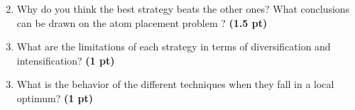 \documentclass[11pt,a4paper]{report}
\begin{document}
\begin{answers}[3.5cm]
\end{answers}


\newpage
\begin{enumerate}
\setcounter{enumi}{3}
\begin{enumerate}
\setcounter{enumii}{1}
    \item Why do you think the best strategy beats the other ones? What conclusions can be drawn on the atom placement problem ? \textbf{(1.5 pt)}
\end{enumerate}
\end{enumerate}

\begin{answers}[7.5cm]
\end{answers}



\begin{enumerate}
\setcounter{enumi}{3}
\begin{enumerate}
\setcounter{enumii}{2}
    \item What are the limitations of each strategy in terms of diversification 
    and intensification? \textbf{(1 pt)}
\end{enumerate}
\end{enumerate}

\begin{answers}[5cm]
\end{answers}



\begin{enumerate}
\setcounter{enumi}{3}
\begin{enumerate}
\setcounter{enumii}{2}
    \item What is the behavior of the different techniques when they fall 
    in a local optimum? \textbf{(1 pt)}
\end{enumerate}
\end{enumerate}

\begin{answers}[5cm]
\end{answers}
\end{document}
